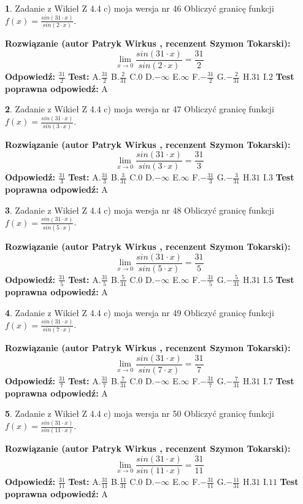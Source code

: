 \documentclass[12pt, a4paper]{article}
\theoremstyle{definition} %
\newtheorem{zad}{}
\newcommand{\zadStart}[1]{\begin{zad}#1\newline}
\newcommand{\zadStop}{\end{zad}}
\newcommand{\rozwStart}[2]{\noindent \textbf{Rozwiązanie (autor #1 , recenzent #2): }\newline}
\newcommand{\rozwStop}{\newline}
\newcommand{\odpStart}{\noindent \textbf{Odpowiedź:}\newline}
\newcommand{\odpStop}{\newline}
\newcommand{\testStart}{\noindent \textbf{Test:}\newline}
\newcommand{\testStop}{\newline}
\newcommand{\kluczStart}{\noindent \textbf{Test poprawna odpowiedź:}\newline}
\newcommand{\kluczStop}{\newline}
\begin{document}
\zadStart{Zadanie z Wikieł Z 4.4 c) moja wersja nr 46}
Obliczyć granicę funkcji $f(x)=\frac{sin(31\cdot x)}{sin(2\cdot x)}$.
\zadStop
\rozwStart{Patryk Wirkus}{Szymon Tokarski}
$$\lim\limits_{x\to 0}\frac{sin(31\cdot x)}{sin(2\cdot x)}=
\frac{31}{2}$$
\rozwStop
\odpStart
$\frac{31}{2}$
\odpStop
\testStart
A.$\frac{31}{2}$
B.$\frac{2}{31}$
C.$0$
D.$-\infty$
E.$\infty$
F.$-\frac{31}{2}$
G.$-\frac{2}{31}$
H.$31$
I.$2$
\testStop
\kluczStart
A
\kluczStop



\zadStart{Zadanie z Wikieł Z 4.4 c) moja wersja nr 47}
Obliczyć granicę funkcji $f(x)=\frac{sin(31\cdot x)}{sin(3\cdot x)}$.
\zadStop
\rozwStart{Patryk Wirkus}{Szymon Tokarski}
$$\lim\limits_{x\to 0}\frac{sin(31\cdot x)}{sin(3\cdot x)}=
\frac{31}{3}$$
\rozwStop
\odpStart
$\frac{31}{3}$
\odpStop
\testStart
A.$\frac{31}{3}$
B.$\frac{3}{31}$
C.$0$
D.$-\infty$
E.$\infty$
F.$-\frac{31}{3}$
G.$-\frac{3}{31}$
H.$31$
I.$3$
\testStop
\kluczStart
A
\kluczStop



\zadStart{Zadanie z Wikieł Z 4.4 c) moja wersja nr 48}
Obliczyć granicę funkcji $f(x)=\frac{sin(31\cdot x)}{sin(5\cdot x)}$.
\zadStop
\rozwStart{Patryk Wirkus}{Szymon Tokarski}
$$\lim\limits_{x\to 0}\frac{sin(31\cdot x)}{sin(5\cdot x)}=
\frac{31}{5}$$
\rozwStop
\odpStart
$\frac{31}{5}$
\odpStop
\testStart
A.$\frac{31}{5}$
B.$\frac{5}{31}$
C.$0$
D.$-\infty$
E.$\infty$
F.$-\frac{31}{5}$
G.$-\frac{5}{31}$
H.$31$
I.$5$
\testStop
\kluczStart
A
\kluczStop



\zadStart{Zadanie z Wikieł Z 4.4 c) moja wersja nr 49}
Obliczyć granicę funkcji $f(x)=\frac{sin(31\cdot x)}{sin(7\cdot x)}$.
\zadStop
\rozwStart{Patryk Wirkus}{Szymon Tokarski}
$$\lim\limits_{x\to 0}\frac{sin(31\cdot x)}{sin(7\cdot x)}=
\frac{31}{7}$$
\rozwStop
\odpStart
$\frac{31}{7}$
\odpStop
\testStart
A.$\frac{31}{7}$
B.$\frac{7}{31}$
C.$0$
D.$-\infty$
E.$\infty$
F.$-\frac{31}{7}$
G.$-\frac{7}{31}$
H.$31$
I.$7$
\testStop
\kluczStart
A
\kluczStop



\zadStart{Zadanie z Wikieł Z 4.4 c) moja wersja nr 50}
Obliczyć granicę funkcji $f(x)=\frac{sin(31\cdot x)}{sin(11\cdot x)}$.
\zadStop
\rozwStart{Patryk Wirkus}{Szymon Tokarski}
$$\lim\limits_{x\to 0}\frac{sin(31\cdot x)}{sin(11\cdot x)}=
\frac{31}{11}$$
\rozwStop
\odpStart
$\frac{31}{11}$
\odpStop
\testStart
A.$\frac{31}{11}$
B.$\frac{11}{31}$
C.$0$
D.$-\infty$
E.$\infty$
F.$-\frac{31}{11}$
G.$-\frac{11}{31}$
H.$31$
I.$11$
\testStop
\kluczStart
A
\kluczStop
\end{document}
